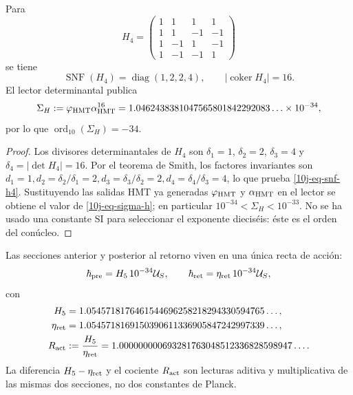 \begin{theorem}
\label{10j-thm-escala-menos34}
Para
\begin{equation}
 H_4=
 \begin{pmatrix}
 1&1&1&1\\
 1&1&-1&-1\\
 1&-1&1&-1\\
 1&-1&-1&1
 \end{pmatrix}
 \label{10j-eq-h4}
\end{equation}
se tiene
\begin{equation}
 \operatorname{SNF}(H_4)=\operatorname{diag}(1,2,2,4),
 \qquad |\operatorname{coker}H_4|=16.
 \label{10j-eq-snf-h4}
\end{equation}
El lector determinantal publica
\begin{equation}
 \Sigma_H:=\varphi_{\rm HMT}\alpha_{\rm HMT}^{16}
 =1.0462438381047565801842292083\ldots\times10^{-34},
 \label{10j-eq-sigma-h}
\end{equation}
por lo que \(\operatorname{ord}_{10}(\Sigma_H)=-34\).
\end{theorem}

\begin{proof}
Los divisores determinantales de \(H_4\) son
\(\delta_1=1\), \(\delta_2=2\), \(\delta_3=4\) y
\(\delta_4=|\det H_4|=16\). Por el teorema de Smith, los factores
invariantes son
\(
 d_1=1,
 d_2=\delta_2/\delta_1=2,
 d_3=\delta_3/\delta_2=2,
 d_4=\delta_4/\delta_3=4
\), lo que prueba \eqref{10j-eq-snf-h4}. Sustituyendo las salidas HMT ya
generadas \(\varphi_{\rm HMT}\) y \(\alpha_{\rm HMT}\) en el lector se
obtiene el valor de \eqref{10j-eq-sigma-h}; en particular
\(10^{-34}<\Sigma_H<10^{-33}\). No se ha usado una constante SI para
seleccionar el exponente dieciséis: éste es el orden del conúcleo.
\end{proof}

Las secciones anterior y posterior al retorno viven en una única recta de
acción:
\begin{equation}
 \hbar_{\rm pre}=H_5\,10^{-34}\mathcal U_S,
 \qquad
 \hbar_{\rm ret}=\eta_{\rm ret}\,10^{-34}\mathcal U_S,
 \label{10j-eq-secciones-accion}
\end{equation}
con
\begin{align}
 H_5&=1.0545718176461544696258218294330594765\ldots,\notag\\
 \eta_{\rm ret}&=1.0545718169150390611336905847242997339\ldots,\notag\\
 R_{\rm act}&:=\frac{H_5}{\eta_{\rm ret}}
 =1.000000000693281763048512336828598947\ldots .
 \label{10j-eq-ract}
\end{align}
La diferencia \(H_5-\eta_{\rm ret}\) y el cociente \(R_{\rm act}\) son
lecturas aditiva y multiplicativa de las mismas dos secciones, no dos
constantes de Planck.

